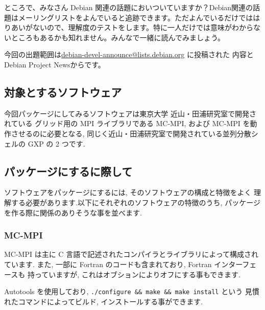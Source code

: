 \documentclass[mingoth,a4paper]{jsarticle}
\begin{document}

ところで、みなさん Debian 関連の話題においついていますか？Debian関連の話
題はメーリングリストをよんでいると追跡できます。ただよんでいるだけではは
りあいがないので、理解度のテストをします。特に一人だけでは意味がわからな
いところもあるかも知れません。みんなで一緒に読んでみましょう。

今回の出題範囲は\url{debian-devel-announce@lists.debian.org} に投稿された
内容とDebian Project Newsからです。

\begin{multicols}{2}
 
\end{multicols}



\subsection{対象とするソフトウェア}

今回パッケージにしてみるソフトウェアは東京大学 近山・田浦研究室で開発されている
グリッド用の MPI ライブラリである MC-MPI,
および MC-MPI を動作させるのに必要となる,
同じく近山・田浦研究室で開発されている並列分散シェルの GXP の 2 つです.

\subsection{パッケージにするに際して}

ソフトウェアをパッケージにするには, そのソフトウェアの構成と特徴をよく
理解する必要があります.以下にそれぞれのソフトウェアの特徴のうち,
パッケージを作る際に関係のありそうな事を並べます.

\subsubsection{MC-MPI}

MC-MPI は主に C 言語で記述されたコンパイラとライブラリによって構成されています.
また, 一部に Fortran のコードも含まれており, Fortran インターフェースも
持っていますが, これはオブションによりオフにする事もできます.

Autotools を使用しており, \verb|./configure && make && make install| という
見慣れたコマンドによってビルド, インストールする事ができます.
\end{document}
